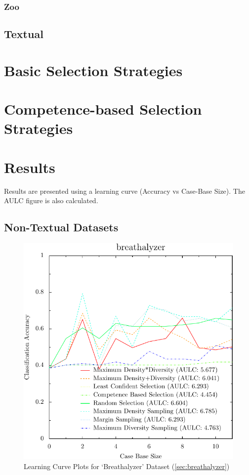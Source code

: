 \documentclass[a4paper,11pt]{report}
\begin{document}
\subsubsection*{Zoo}\label{sec:zoo}
\subsection{Textual}

\section{Basic Selection Strategies}


\section{Competence-based Selection Strategies}

\section{Results}
Results are presented using a learning curve (Accuracy vs Case-Base Size). The AULC figure is also calculated.

\subsection{Non-Textual Datasets}

\begin{figure}[h!]
\includegraphics{./Plots/breathalyzer}
\caption{Learning Curve Plots for `Breathalyzer' Dataset (\ref{sec:breathalyzer})}
\end{figure}
\end{document}
